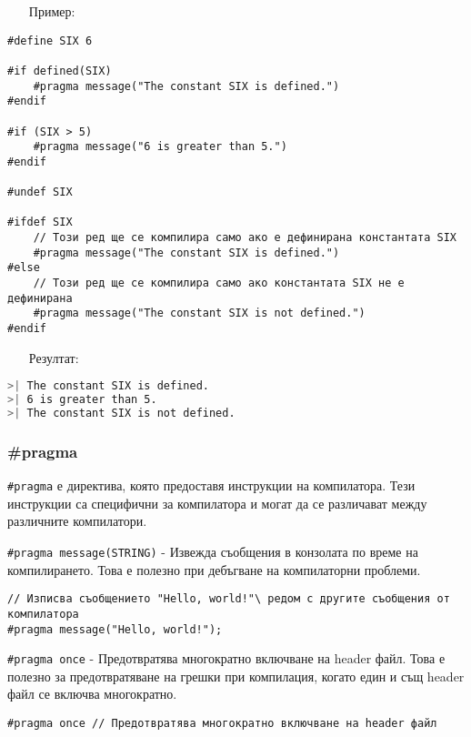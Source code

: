 \documentclass[oneside]{book}
\newcommand*{\code}[1]{\texttt{#1}}
\begin{document}
\begin{itemize}\item [Пример:]\end{itemize}
\begin{mdframed}\begin{lstlisting}
#define SIX 6

#if defined(SIX)
    #pragma message("The constant SIX is defined.")
#endif

#if (SIX > 5)
    #pragma message("6 is greater than 5.")
#endif

#undef SIX

#ifdef SIX
    // Този ред ще се компилира само ако е дефинирана константата SIX
    #pragma message("The constant SIX is defined.")
#else
    // Този ред ще се компилира само ако константата SIX не е дефинирана
    #pragma message("The constant SIX is not defined.")
#endif
\end{lstlisting}\end{mdframed}
\pagebreak
\begin{itemize}\item [Резултат:]\end{itemize}
\begin{mdframed}\begin{lstlisting}[language=bash]
>| The constant SIX is defined.
>| 6 is greater than 5.
>| The constant SIX is not defined.
\end{lstlisting}\end{mdframed}
\subsubsection{\#pragma}
\code{\#pragma} е директива, която предоставя инструкции на компилатора. Тези инструкции са специфични за компилатора и могат да се различават между различните компилатори.

\code{\#pragma message(STRING)} - Извежда съобщения в конзолата по време на компилирането. Това е полезно при дебъгване на компилаторни проблеми.
\begin{mdframed}\begin{lstlisting}
// Изписва съобщението "Hello, world!"\ редом с другите съобщения от компилатора
#pragma message("Hello, world!");
\end{lstlisting}\end{mdframed}

\code{\#pragma once} - Предотвратява многократно включване на header файл. Това е полезно за предотвратяване на грешки при компилация, когато един и същ header файл се включва многократно.
\begin{mdframed}\begin{lstlisting}
#pragma once // Предотвратява многократно включване на header файл
\end{lstlisting}\end{mdframed}
\end{document}

